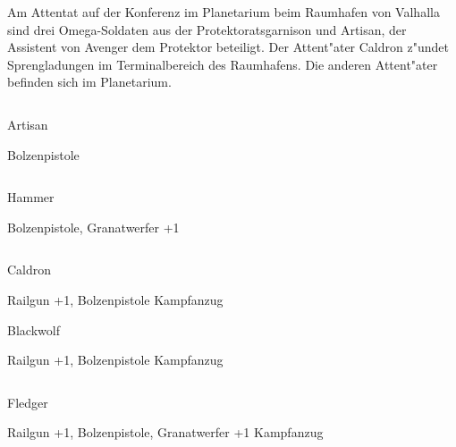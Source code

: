 
Am Attentat auf der Konferenz im Planetarium beim Raumhafen von Valhalla sind drei Omega-Soldaten aus der Protektoratsgarnison und Artisan, der Assistent von Avenger dem Protektor beteiligt. Der Attent"ater Caldron z"undet Sprengladungen im Terminalbereich des Raumhafens. Die anderen Attent"ater befinden sich im Planetarium.

\begin{column}[l]{0.45}
    \begin{nscsheet}[h]{Artisan}
        \nscstats[ATT=2,AGG=2,DEX=2,COM=3]
        \nscruler
        \begin{nscinventory}
            \nscitem[Waffen] Bolzenpistole
        \end{nscinventory}
    \end{nscsheet}
\end{column}
\begin{column}[r]{0.45}
    \begin{nscsheet}[h]{Hammer}
        \nscstats[ATT=2,AGG=3,CON=2]
        \nscruler
        \begin{nscinventory}
            \nscitem[Waffen] Bolzenpistole, Granatwerfer +1            
        \end{nscinventory}
    \end{nscsheet}
\end{column}

\begin{column}[l]{0.45}
    \begin{nscsheet}[h]{Caldron}
        \nscstats[ATT=2,AGG=3,CON=2]
        \nscruler
        \begin{nscinventory}
            \nscitem[Waffen] Railgun +1, Bolzenpistole
            \nscitem[R"ustung] Kampfanzug
        \end{nscinventory}
    \end{nscsheet}

    \begin{nscsheet}[h]{Blackwolf}
        \nscstats[ATT=2,AGG=3,CON=2]
        \nscruler
        \begin{nscinventory}
            \nscitem[Waffen] Railgun +1, Bolzenpistole
            \nscitem[R"ustung] Kampfanzug
        \end{nscinventory}
    \end{nscsheet}    
\end{column}
\begin{column}[r]{0.45}
    \begin{nscsheet}[h]{Fledger}
        \nscstats[ATT=2,AGG=3,CON=2]
        \nscruler
        \begin{nscinventory}
            \nscitem[Waffen] Railgun +1, Bolzenpistole, Granatwerfer +1
            \nscitem[R"ustung] Kampfanzug
        \end{nscinventory}
    \end{nscsheet}        
\end{column}

